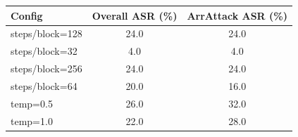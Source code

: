 \begin{tabular}{lcc}
\toprule
\textbf{Config} & \textbf{Overall ASR (\%)} & \textbf{ArrAttack ASR (\%)} \\
\midrule
steps/block=128 & 24.0 & 24.0 \\
steps/block=32 & 4.0 & 4.0 \\
steps/block=256 & 24.0 & 24.0 \\
steps/block=64 & 20.0 & 16.0 \\
temp=0.5 & 26.0 & 32.0 \\
temp=1.0 & 22.0 & 28.0 \\
\bottomrule
\end{tabular}
